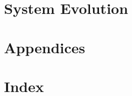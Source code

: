 \documentclass[letterpaper]{article}
\begin{document}
\section{System Evolution}
\pagebreak

\section{Appendices}
\pagebreak

\section{Index}
\pagebreak
\end{document}
